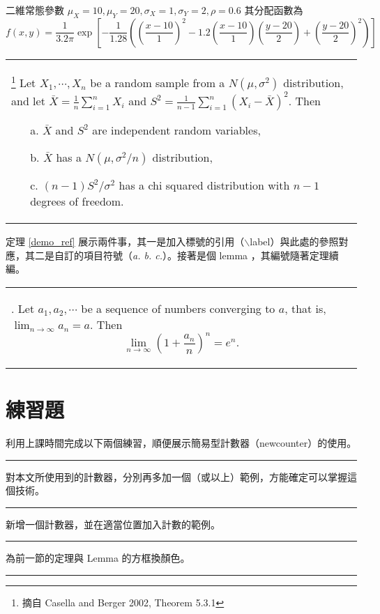 \begin{ex} %
二維常態參數 $\mu_X=10, \mu_Y=20, \sigma_X=1, \sigma_Y=2, \rho=0.6$ 其分配函數為
\begin{equation*}
f(x,y)=\frac{1}{3.2\pi}\exp\left[-\frac{1}{1.28}\left((\frac{x-10}{1})^2
       -1.2(\frac{x-10}{1})(\frac{y-20}{2})+(\frac{y-20}{2})^2 \right)\right]
\end{equation*}
\end{ex}
\bigskip
\begin{center}\colorbox{slight}{\begin{tabular}{p{}}
\begin{thm}\label{demo_ref}\footnote{摘自 Casella and Berger 2002, Theorem 5.3.1} %
Let $X_1, \cdots, X_n$ be a random sample from a $N(\mu, \sigma^2)$ distribution, and let
$\bar{X}=\frac{1}{n}\sum_{i=1}^n X_i$ and $S^2=\frac{1}{n-1}\sum_{i=1}^n (X_i-\bar{X})^2$.  Then
\begin{itemize}
\item[a.] $\bar{X}$ and $S^2$ are independent random variables,
\item[b.] $\bar{X}$ has a $N(\mu, \sigma^2/n)$ distribution,
\item[c.] $(n-1)S^2/\sigma^2$ has a chi squared distribution with $n-1$ degrees of freedom.
\end{itemize}
\end{thm}
 \end{tabular}}\end{center}
\bigskip

定理 \ref{demo_ref} 展示兩件事，其一是加入標號的引用（$\backslash$label）與此處的參照對應，其二是自訂的項目符號（\textit{a. b. c.}）。接著是個 lemma ，其編號隨著定理續編。
\begin{center}\colorbox{slight}{\begin{tabular}{p{}}
\begin{lemma}. Let $a_1,a_2,\cdots$ be a sequence of numbers converging to $a$, that is, $\lim_{n\rightarrow \infty} a_n=a$. Then
$$\lim_{n\rightarrow \infty} (1+\frac{a_n}{n})^n=e^n.$$
\end{lemma}
 \end{tabular}}\end{center}

\section{練習題}
利用上課時間完成以下兩個練習，順便展示簡易型計數器（newcounter）的使用。

\rule{\textwidth}{0.2pt}
\thequiz \;\;對本文所使用到的計數器，分別再多加一個（或以上）範例，方能確定可以掌握這個技術。\\
\rule{\textwidth}{0.2pt}
\addtocounter{quiz}{1} 		%
\thequiz \;\;新增一個計數器，並在適當位置加入計數的範例。\\
\rule{\textwidth}{0.2pt}
\addtocounter{quiz}{1} 		%
\thequiz \;\;為前一節的定理與 Lemma 的方框換顏色。\\
\rule{\textwidth}{0.2pt}
%
